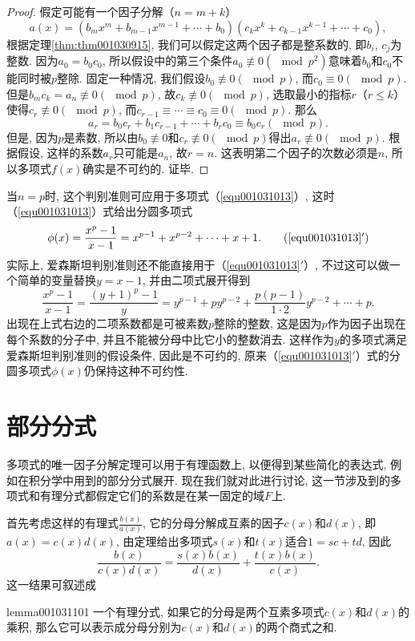 \begin{proof}
假定可能有一个因子分解（$n=m+k$）
\[
a(x)=(b_mx^m+b_{m-1}x^{m-1}+\cdots + b_0)(c_kx^k+c_{k-1}x^{k-1} + \cdots + c_0),
\]
根据定理\ref{thm:thm001030915}, 我们可以假定这两个因子都是整系数的, 即$b_i$, $c_j$为整数. 因为$a_0=b_0c_0$, 所以假设中的第三个条件$a_0 \not\equiv 0 (\mod{p^2})$意味着$b_0$和$c_0$不能同时被$p$整除. 固定一种情况, 我们假设$b_0 \not\equiv 0(\mod{p})$, 而$c_0 \equiv 0(\mod{p})$. 但是$b_mc_k = a_n \not\equiv 0(\mod{p})$, 故$c_k \not\equiv 0(\mod{p})$, 选取最小的指标$r$（$r \le k$）使得$c_r \not\equiv 0(\mod{p})$, 而$c_{r-1}\equiv\cdots\equiv c_0 \equiv 0(\mod{p})$. 那么
\[
a_r = b_0c_r + b_1c_{r-1} + \cdots + b_rc_0 \equiv b_0c_r(\mod{p}).
\]
但是, 因为$p$是素数, 所以由$b_0 \not\equiv 0$和$c_r \not\equiv 0(\mod{p})$得出$a_r \not\equiv 0(\mod{p})$. 根据假设, 这样的系数$a_r$只可能是$a_n$, 故$r=n$. 这表明第二个因子的次数必须是$n$, 所以多项式$f(x)$确实是不可约的. 证毕. 
\end{proof}

当$n=p$时, 这个判别准则可应用于多项式（\ref{equ001031013}）, 这时（\ref{equ001031013}）式给出分圆多项式
\begin{equation}
\phi(x)=\frac{x^p-1}{x-1}=x^{p-1}+x^{p-2}+\cdots +x+1. \tag{\ref{equ001031013}$'$}
\end{equation}
实际上, 爱森斯坦判别准则还不能直接用于（\ref{equ001031013}$'$）, 不过这可以做一个简单的变量替换$y = x - 1$, 并由二项式展开得到
\[
\frac{x^p-1}{x-1} = \frac{(y+1)^p-1}{y} = y^{p-1} + py^{p-2} + \frac{p(p-1)}{1 \cdot 2}y^{p-2} + \cdots + p.
\]
出现在上式右边的二项系数都是可被素数$p$整除的整数, 这是因为$p$作为因子出现在每个系数的分子中, 并且不能被分母中比它小的整数消去. 这样作为$y$的多项式满足爱森斯坦判别准则的假设条件, 因此是不可约的, 原来（\ref{equ001031013}$'$）式的分圆多项式$\phi(x)$仍保持这种不可约性. 


\section{部分分式}\label{subsection0010311}
多项式的唯一因子分解定理可以用于有理函数上, 以便得到某些简化的表达式, 例如在积分学中用到的部分分式展开. 现在我们就对此进行讨论, 这一节涉及到的多项式和有理分式都假定它们的系数是在某一固定的域$F$上. 

首先考虑这样的有理式$\frac{b(x)}{a(x)}$, 它的分母分解成互素的因子$c(x)$和$d(x)$, 即$a(x)=c(x)d(x)$, 由定理给出多项式$s(x)$和$t(x)$适合$1 = sc+td$, 因此
\begin{equation}\label{equ001031114}
\frac{b(x)}{c(x)d(x)} = \frac{s(x)b(x)}{d(x)} + \frac{t(x)b(x)}{c(x)}.
\end{equation}
这一结果可叙述成
\begin{lemma}{}{lemma001031101}
一个有理分式, 如果它的分母是两个互素多项式$c(x)$和$d(x)$的乘积, 那么它可以表示成分母分别为$c(x)$和$d(x)$的两个商式之和. 
\end{lemma}

